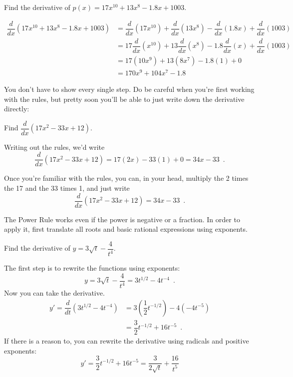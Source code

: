 \begin{example}
Find the derivative of $p(x)=17x^{10}+13x^8-1.8x+1003$.

\begin{solution} 
    \begin{align*}
		\dfrac{d}{dx}\left( 17x^{10}+13x^8-1.8x+1003 \right) &= \dfrac{d}{dx}\left( 17x^{10} \right)+\dfrac{d}{dx}\left( 13x^8 \right)-\dfrac{d}{dx}\left( 1.8x \right)+\dfrac{d}{dx}\left( 1003 \right)\\
		 &= 17\dfrac{d}{dx}\left( x^{10} \right)+13\dfrac{d}{dx}\left( x^8 \right)-1.8\dfrac{d}{dx}\left( x \right)+\dfrac{d}{dx}\left( 1003 \right)\\
		 &= 17\left(10x^9\right)+13\left(8x^7\right)-1.8\left(1\right)+0\\
		 &= 170x^9+104x^7-1.8
	\end{align*}
\end{solution}\end{example}

You don't have to show every single step. Do be careful when you're first working with the rules, but pretty soon you'll be able to just write down the derivative directly:

\begin{example}
Find $\dfrac{d}{dx}(17x^2-33x+12).$

\begin{solution} Writing out the rules, we'd write
$$\dfrac{d}{dx}(17x^2-33x+12)=17(2x)-33(1)+0=34x-33 \enspace.$$

Once you're familiar with the rules, you can, in your head, multiply the 2 times the 17 and the 33 times 1, and just write
$$\dfrac{d}{dx}(17x^2-33x+12)=34x-33 \enspace .$$
\end{solution}\end{example}

The Power Rule works even if the power is negative or a fraction. In order to apply it, first translate all roots and basic rational expressions using exponents.

\begin{example}
Find the derivative of $y=3\sqrt{t}-\dfrac{4}{t^4}$.

\begin{solution} The first step is to rewrite the functions using exponents:  
    $$y=3\sqrt{t}-\dfrac{4}{t^4} = 3t^{1/2}-4t^{-4} \enspace .$$
Now you can take the derivative.
	\begin{align*}
    	y' = \dfrac{d}{dt}\left( 3t^{1/2}-4t^{-4} \right) &= 3\left(\dfrac{1}{2}t^{-1/2}\right)-4\left(-4t^{-5}\right) \\
		&= \dfrac{3}{2}t^{-1/2}+16t^{-5} \enspace . 
		\end{align*}
If there is a reason to, you can rewrite the derivative using radicals and positive exponents: 
$$y'= \dfrac{3}{2}t^{-1/2}+16t^{-5} = \dfrac{3}{2\sqrt{t}}+\dfrac{16}{t^5}$$
\end{solution}\end{example}

